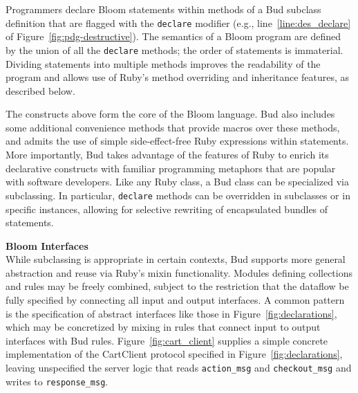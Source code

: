 Programmers declare Bloom statements within methods of a Bud subclass
definition that are flagged with the \texttt{declare} modifier (e.g.,
line~\ref{line:des_declare} of Figure~\ref{fig:pdg-destructive}). The semantics
of a Bloom program are defined by the union of all the \texttt{declare}
methods; the order of statements is immaterial. Dividing statements into multiple
methods improves the readability of the program and allows use of Ruby's method
overriding and inheritance features, as described below.


The constructs above form the core of the Bloom language.
Bud also includes some additional convenience methods that provide macros over these methods, and admits the use of simple side-effect-free Ruby expressions within statements.  More importantly, Bud takes advantage of the features of Ruby to enrich its declarative constructs with familiar programming metaphors that are popular with software developers.  Like any Ruby class, a Bud class can be specialized via subclassing.  In particular, \texttt{declare} methods can be overridden in subclasses or in specific instances, allowing for selective rewriting of encapsulated bundles of statements.%

\vspace{9pt}\noindent \textbf{Bloom Interfaces}\\
While subclassing is appropriate in certain contexts, Bud supports more general abstraction and reuse via 
Ruby's mixin functionality.  Modules defining collections and rules may be freely combined, subject to the restriction
that the dataflow be fully specified by connecting all input and output interfaces.  A common pattern is the
specification of abstract interfaces like those in Figure~\ref{fig:declarations}, which may be concretized by 
mixing in rules that connect input to output interfaces with Bud rules.  Figure~\ref{fig:cart_client} supplies
a simple concrete implementation of the CartClient protocol specified in Figure~\ref{fig:declarations}, leaving
unspecified the server logic that reads \texttt{action\_msg} and \texttt{checkout\_msg} and writes to
\texttt{response\_msg}.


